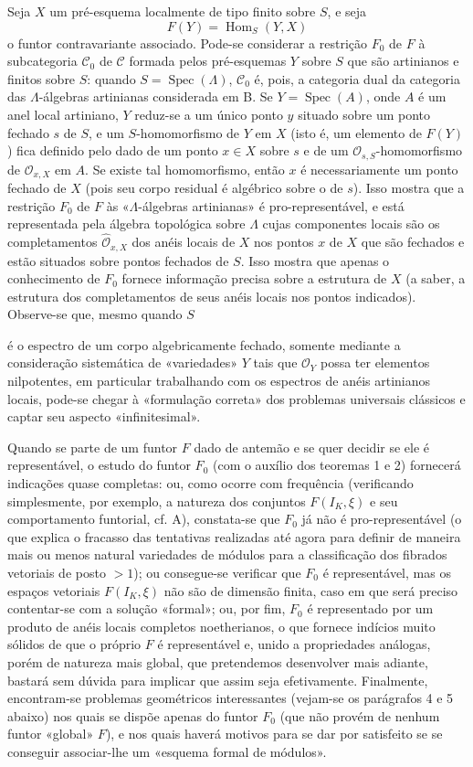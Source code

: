 \documentclass[11pt,twoside,openany]{book}
\numberwithin{equation}{section}
\newcommand{\src}[1]{%
  \phantomsection\hypertarget{src:#1}{}%
  \marginpar{\raggedleft\footnotesize\sffamily #1}%
}
\theoremstyle{plain}
\theoremstyle{definition}
\theoremstyle{remark}
\newcommand{\FgaUnitKey}{frontmatter}
\renewcommand{\src}[1]{%
  \phantomsection\hypertarget{src:\FgaUnitKey:#1}{}%
  \marginpar{\raggedleft\footnotesize\sffamily #1}%
}
\begin{document}
Seja $X$ um pré-esquema localmente de tipo finito sobre $S$, e seja
\[
  F(Y)=\operatorname{Hom}_S(Y,X)
\]
o funtor contravariante associado. Pode-se considerar a restrição $F_0$ de
$F$ à subcategoria $\mathcal C_0$ de $\mathcal C$ formada pelos
pré-esquemas $Y$ sobre $S$ que são artinianos e finitos sobre $S$: quando
$S=\operatorname{Spec}(\Lambda)$, $\mathcal C_0$ é, pois, a categoria dual
da categoria das $\Lambda$-álgebras artinianas considerada em B. Se
$Y=\operatorname{Spec}(A)$, onde $A$ é um anel local artiniano, $Y$
reduz-se a um único ponto $y$ situado sobre um ponto fechado $s$ de $S$, e um
$S$-homomorfismo de $Y$ em $X$ (isto é, um elemento de $F(Y)$) fica definido
pelo dado de um ponto $x\in X$ sobre $s$ e de um
$\mathcal O_{s,S}$-homomorfismo de $\mathcal O_{x,X}$ em $A$. Se existe tal
homomorfismo, então $x$ é necessariamente um ponto fechado de $X$ (pois seu
corpo residual é algébrico sobre o de $s$). Isso mostra que a restrição
$F_0$ de $F$ às «$\Lambda$-álgebras artinianas» é pro-representável, e está
representada pela álgebra topológica sobre $\Lambda$ cujas componentes
locais são os completamentos $\widehat{\mathcal O}_{x,X}$ dos anéis locais
de $X$ nos pontos $x$ de $X$ que são fechados e estão situados sobre pontos
fechados de $S$. Isso mostra que apenas o conhecimento de $F_0$ fornece
informação precisa sobre a estrutura de $X$ (a saber, a estrutura dos
completamentos de seus anéis locais nos pontos indicados). Observe-se que,
mesmo quando $S$

\src{380}
é o espectro de um corpo algebricamente fechado, somente mediante a
consideração sistemática de «variedades» $Y$ tais que $\mathcal O_Y$ possa
ter elementos nilpotentes, em particular trabalhando com os espectros de
anéis artinianos locais, pode-se chegar à «formulação correta» dos
problemas universais clássicos e captar seu aspecto «infinitesimal».

Quando se parte de um funtor $F$ dado de antemão e se quer decidir se ele é
representável, o estudo do funtor $F_0$ (com o auxílio dos teoremas 1 e 2)
fornecerá indicações quase completas: ou, como ocorre com frequência
(verificando simplesmente, por exemplo, a natureza dos conjuntos
$F(I_K,\xi)$ e seu comportamento funtorial, cf. A), constata-se que $F_0$ já não
é pro-representável (o que explica o fracasso das tentativas realizadas
até agora para definir de maneira mais ou menos natural variedades de módulos
para a classificação dos fibrados vetoriais de posto $>1$); ou consegue-se
verificar que $F_0$ é representável, mas os espaços vetoriais
$F(I_K,\xi)$ não são de dimensão finita, caso em que será preciso contentar-se com
a solução «formal»; ou, por fim, $F_0$ é representado por um
produto de anéis locais completos noetherianos, o que fornece indícios muito
sólidos de que o próprio $F$ é representável e, unido a propriedades análogas,
porém de natureza mais global, que pretendemos desenvolver mais adiante, bastará
sem dúvida para implicar que assim seja efetivamente. Finalmente, encontram-se
problemas geométricos interessantes (vejam-se os parágrafos 4 e 5 abaixo) nos
quais se dispõe apenas do funtor $F_0$ (que não provém de nenhum funtor «global»
$F$), e nos quais haverá motivos para se dar por satisfeito se se conseguir associar-lhe
um «esquema formal de módulos».
\end{document}
